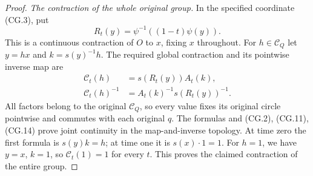 \begin{proof}
\emph{The contraction of the whole original group.}
In the specified coordinate (CG.3), put
\[
             R_t(y)=\psi^{-1}((1-t)\psi(y)).                   \tag{CG.14}
\]
This is a continuous contraction of $O$ to $x$,
fixing $x$ throughout.  For $h\in\mathscr C_Q$ let
$y=hx$ and $k=s(y)^{-1}h$.  The required global
contraction and its pointwise inverse map are
\[
 \begin{aligned}
 \mathcal C_t(h)&=s(R_t(y))A_t(k),\\
 \mathcal C_t(h)^{-1}&=A_t(k)^{-1}s(R_t(y))^{-1}.
 \end{aligned}                                                    \tag{CG.15}
\]
All factors belong to the original $\mathscr C_Q$,
so every value fixes its original circle pointwise
and commutes with each original $q$.
The formulas and (CG.2), (CG.11), (CG.14) prove
joint continuity in the map-and-inverse topology.
At time zero the first formula is $s(y)k=h$;
at time one it is $s(x)\cdot1=1$.
For $h=1$, we have $y=x$, $k=1$, so
$\mathcal C_t(1)=1$ for every $t$.
This proves the claimed contraction of the entire group.
\end{proof}

